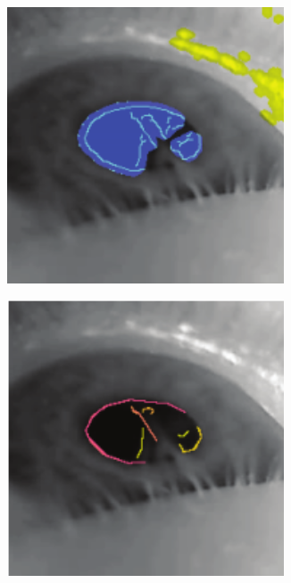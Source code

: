 \documentclass[USenglish,twocolumn]{article}
\begin{document}
\begin{figure}[H]
	\begin{subfigure}[b]{0.15\textwidth}
	\centering
	\includegraphics[width=0.9\textwidth]{img/PupilLab/4.png}
	\caption{}
	\label{fig:pupilLab4}
\end{subfigure}%
\begin{subfigure}[b]{0.15\textwidth}
	\centering
	\includegraphics[width=0.9\textwidth]{img/PupilLab/5.png}
	\caption{}

\end{subfigure}
\end{figure}
\end{document}
